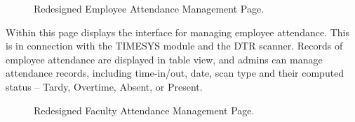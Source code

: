     \begin{figure}[H]
        \centering
        \caption{Redesigned Employee Attendance Management Page.}
        \label{fig:app-attendance-emp}
    \end{figure}

    Within this page displays the interface for managing employee attendance. This is in connection with the TIMESYS module and the DTR scanner. Records of employee attendance are displayed in table view, and admins can manage attendance records, including time-in/out, date, scan type and their computed status -- Tardy, Overtime, Absent, or Present.

    \begin{figure}[H]
        \centering
        \caption{Redesigned Faculty Attendance Management Page.}
        \label{fig:app-attendance-fac}
    \end{figure}

